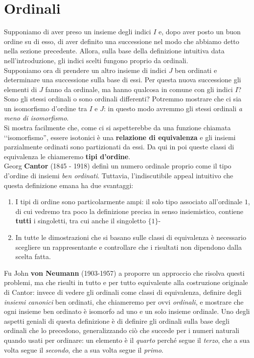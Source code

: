 \section{Ordinali}
Supponiamo di aver preso un insieme degli indici $I$ e, dopo aver posto un buon ordine su di esso, di aver definito una successione nel modo che abbiamo detto nella sezione precedente. Allora, sulla base della definizione intuitiva data nell'introduzione, gli indici scelti fungono proprio da ordinali.\\
Supponiamo ora di prendere un altro insieme di indici $J$ ben ordinati e determinare una successione sulla base di essi. Per questa nuova successione gli elementi di $J$ fanno da ordinale, ma hanno qualcosa in comune con gli indici $I$? Sono gli stessi ordinali o sono ordinali differenti? Potremmo mostrare che ci sia un isomorfismo d'ordine tra $I$ e $J$: in questo modo avremmo gli stessi ordinali \textit{a meno di isomorfismo}.\\
Si mostra facilmente che, come ci si aspetterebbe da una funzione chiamata ‘‘isomorfismo'', essere isotonici è una \textbf{relazione di equivalenza} e gli insiemi parzialmente ordinati sono partizionati da essi. Da qui in poi queste classi di equivalenza le chiameremo \textbf{tipi d'ordine}.\\
Georg \textbf{Cantor} (1845 - 1918) definì un numero ordinale proprio come il tipo d'ordine di insiemi \textit{ben ordinati}. Tuttavia, l'indiscutibile appeal intuitivo che questa definizione emana ha due svantaggi:
\begin{enumerate}
	\item I tipi di ordine sono particolarmente ampi: il solo tipo associato all'ordinale $1$, di cui vedremo tra poco la definizione precisa in senso insiemistico, contiene \textbf{tutti} i singoletti, tra cui anche il singoletto $\{1\}$-
	\item In tutte le dimostrazioni che si basano sulle classi di equivalenza è necessario scegliere un rappresentante e controllare che i risultati non dipendono dalla scelta fatta.
\end{enumerate}
Fu John \textbf{von Neumann} (1903-1957)  a proporre un approccio che risolva questi problemi, ma che risulti in tutto e per tutto equivalente alla costruzione originale di Cantor: invece di vedere gli ordinali come classi di equivalenza, definire degli \textit{insiemi canonici} ben ordinati, che chiameremo per ovvi \textit{ordinali}, e mostrare che ogni insieme ben ordinato è isomorfo ad uno e un solo insieme ordinale. Uno degli aspetti geniali di questa definizione è di definire gli ordinali sulla base degli ordinali che lo precedono, generalizzando ciò che succede per i numeri naturali quando usati per ordinare: un elemento è il \textit{quarto} perché segue il \textit{terzo}, che a sua volta segue il \textit{secondo}, che a sua volta segue il \textit{primo}.\\
